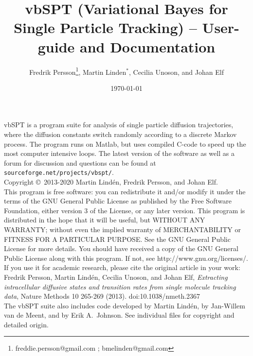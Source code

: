 \documentclass[11pt,a4paper]{article}
\title{vbSPT (Variational Bayes for Single Particle Tracking) -- User-guide and Documentation}
\author{Fredrik Persson\footnote{freddie.persson@gmail.com ; bmelinden@gmail.com},
Martin Linden$^*$, Cecilia Unoson, and Johan Elf}
\date{\today}
\begin{document}
\maketitle 

\noindent vbSPT is a program suite for analysis of single particle diffusion
trajectories, where the diffusion constants switch randomly according
to a discrete Markov process. The program runs on Matlab, but uses
compiled C-code to speed up the most computer intensive loops.  The
latest version of the software as well as a forum for discussion and
questions can be found at \texttt{sourceforge.net/projects/vbspt/}.\medskip\\

\noindent Copyright \copyright \  2013-2020
Martin Lind\'en, Fredrik Persson, and
Johan Elf.\medskip\\
 
\noindent This program is free software: you can redistribute it
and/or modify it under the terms of the GNU General Public License as
published by the Free Software Foundation, either version 3 of the
License, or any later version.  This program is distributed in the
hope that it will be useful, but WITHOUT ANY WARRANTY; without even
the implied warranty of MERCHANTABILITY or FITNESS FOR A PARTICULAR
PURPOSE. See the GNU General Public License for more details. You
should have received a copy of the GNU General Public License along
with this program. If not, see http://www.gnu.org/licenses/.\medskip\\

\noindent If you use it for academic research, please cite the
original article in your work:\medskip\\
\noindent Fredrik Persson, Martin Lind\'en, Cecilia Unoson, and Johan
Elf, \emph{Extracting intracellular diffusive states and transition
  rates from single molecule tracking data}, Nature Methods 10 265-269
(2013). doi:10.1038/nmeth.2367 \medskip\\

\noindent The vbSPT suite also includes code developed by Martin
Lind\'en, by Jan-Willem van de Meent, and by Erik A.~Johnson. See
individual files for copyright and detailed origin.
\end{document}
